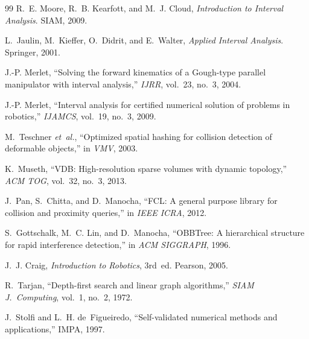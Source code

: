 \documentclass[journal]{IEEEtran}
\makeatletter
\newcommand{\etal}{\textit{et~al.}\@\xspace}
\makeatother
\begin{document}
\begin{thebibliography}{99}
R.~E. Moore, R.~B. Kearfott, and M.~J. Cloud, \emph{Introduction to Interval Analysis}. SIAM, 2009.

L.~Jaulin, M.~Kieffer, O.~Didrit, and E.~Walter, \emph{Applied Interval Analysis}. Springer, 2001.

J.-P. Merlet, ``Solving the forward kinematics of a Gough-type parallel manipulator with interval analysis,'' \emph{IJRR}, vol.~23, no.~3, 2004.

J.-P. Merlet, ``Interval analysis for certified numerical solution of problems in robotics,'' \emph{IJAMCS}, vol.~19, no.~3, 2009.

M.~Teschner \etal, ``Optimized spatial hashing for collision detection of deformable objects,'' in \emph{VMV}, 2003.

K.~Museth, ``VDB: High-resolution sparse volumes with dynamic topology,'' \emph{ACM TOG}, vol.~32, no.~3, 2013.

J.~Pan, S.~Chitta, and D.~Manocha, ``FCL: A general purpose library for collision and proximity queries,'' in \emph{IEEE ICRA}, 2012.

S.~Gottschalk, M.~C. Lin, and D.~Manocha, ``OBBTree: A hierarchical structure for rapid interference detection,'' in \emph{ACM SIGGRAPH}, 1996.

J.~J. Craig, \emph{Introduction to Robotics}, 3rd~ed. Pearson, 2005.

R.~Tarjan, ``Depth-first search and linear graph algorithms,'' \emph{SIAM J.\ Computing}, vol.~1, no.~2, 1972.

J.~Stolfi and L.~H. de~Figueiredo, ``Self-validated numerical methods and applications,'' IMPA, 1997.

\end{thebibliography}
\end{document}
